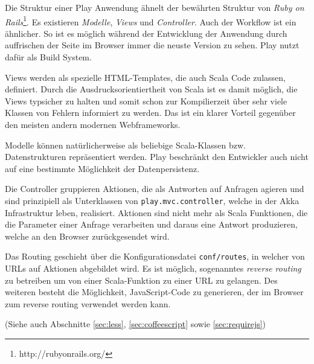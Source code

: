 Die Struktur einer Play Anwendung ähnelt der bewährten Struktur von \textit{Ruby on
Rails}\footnote{http://rubyonrails.org/}. Es existieren \textit{Modelle}, \textit{Views} und
\textit{Controller}. Auch der Workflow ist ein ähnlicher. So ist es möglich während der
Entwicklung der Anwendung durch auffrischen der Seite im Browser immer die neuste Version zu sehen.
Play nutzt dafür  als Build System.

Views werden als spezielle HTML-Templates, die auch Scala Code zulassen, definiert. Durch die
Ausdrucksorientiertheit von Scala ist es damit möglich, die Views typsicher zu halten und somit schon
zur Kompilierzeit über sehr viele Klassen von Fehlern informiert zu werden. Das ist ein klarer
Vorteil gegenüber den meisten andern modernen Webframeworks.

Modelle können natürlicherweise als beliebige Scala-Klassen bzw. Datenstrukturen repräsentiert
werden. Play beschränkt den Entwickler auch nicht auf eine bestimmte Möglichkeit der
Datenpersistenz.

Die Controller gruppieren Aktionen, die als Antworten auf Anfragen agieren und sind prinzipiell
als Unterklassen von \texttt{play.mvc.controller}, welche in der Akka Infrastruktur leben,
realisiert. Aktionen sind nicht mehr als Scala Funktionen, die die Parameter einer Anfrage
verarbeiten und daraus eine Antwort produzieren, welche an den Browser zurückgesendet wird.

Das Routing geschieht über die Konfigurationsdatei \texttt{conf/routes}, in welcher von URLs auf
Aktionen abgebildet wird. Es ist möglich, sogenanntes \textit{reverse routing} zu betreiben um von
einer Scala-Funktion zu einer URL zu gelangen. Des weiteren besteht die Möglichkeit, JavaScript-Code 
zu generieren, der im Browser zum reverse routing verwendet werden kann.

(Siehe auch Abschnitte \ref{sec:less}, \ref{sec:coffeescript} sowie \ref{sec:requirejs})

\label{sec:play}